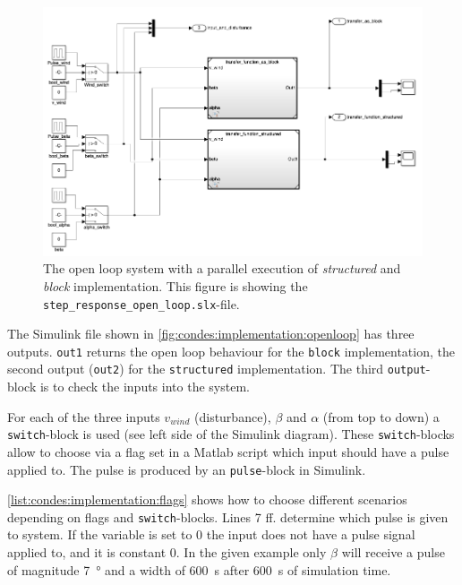 \begin{figure}[H]
    \center
    \includegraphics[width=1\textwidth,scale=1,trim=0 0 0 0,clip]{fig/Simulink/simulink_open_loop.png}
    \caption{The open loop system with a parallel execution of \textit{structured} and \textit{block} implementation. This figure is showing the \texttt{step\_response\_open\_loop.slx}-file.}
    \label{fig:condes:implementation:openloop}
\end{figure}

The Simulink file shown in \autoref{fig:condes:implementation:openloop} has three outputs.
\texttt{out1} returns the open loop behaviour for the \texttt{block} implementation, the second output (\texttt{out2}) for the \texttt{structured} implementation. 
The third \texttt{output}-block is to check the inputs into the system.

For each of the three inputs $v_{wind}$ (disturbance), $\beta$ and $\alpha$ (from top to down) a \texttt{switch}-block is used (see left side of the Simulink diagram).
These \texttt{switch}-blocks allow to choose via a flag set in a Matlab script which input should have a pulse applied to.
The pulse is produced by an \texttt{pulse}-block in Simulink.

\autoref{list:condes:implementation:flags} shows how to choose different scenarios depending on flags and \texttt{switch}-blocks.
Lines 7 ff. determine which pulse is given to system.
If the variable is set to $0$ the input does not have a pulse signal applied to, and it is constant $0$.
In the given example only $\beta$ will receive a pulse of magnitude \SI{7}{\degree} and a width of \SI{600}{\second} after \SI{600}{\second} of simulation time.

